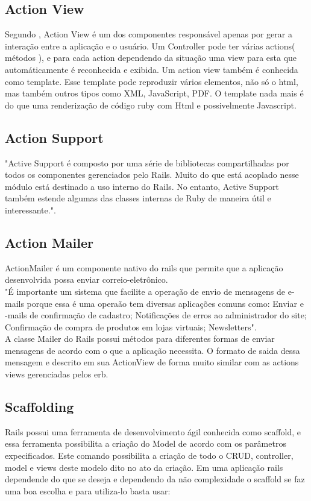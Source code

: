\subsection{Action View}
Segundo \cite{BAKHARIA}, Action View é um dos componentes responsável apenas por gerar a interação entre a aplicação e o usuário. Um Controller pode ter várias actions( métodos ), e para cada action dependendo da situação uma view para esta que automáticamente é reconhecida e exibida.
Um action view também é conhecida como template. Esse template pode reproduzir vários elementos, não só o html, mas também outros tipos como XML, JavaScript, PDF.
O template nada mais é do que uma renderização de código ruby com Html e possivelmente Javascript.


\subsection{Action Support}
"Active Support é composto por uma série de bibliotecas compartilhadas por todos os componentes gerenciados pelo Rails. 
Muito do que está acoplado nesse módulo está destinado a uso interno do Rails.
No entanto, Active Support também estende algumas das classes internas de Ruby de maneira útil e interessante."\cite{PRAGMATICRUBY}.

\subsection{Action Mailer}
ActionMailer é um componente nativo do rails que permite que a aplicação desenvolvida possa enviar correio-eletrônico. 
\\
"É importante um sistema que facilite a operação de envio de mensagens de e-mails porque
essa é uma operaão tem diversas aplicações comuns como: Enviar e -mails de confirmação de
cadastro; Notificações de erros ao administrador do site; Confirmação de compra de produtos
em lojas virtuais; Newsletters".\cite{BAKHARIA}
\\
\noindent A classe Mailer do Rails possui métodos para diferentes formas de enviar mensagens de acordo com o que a aplicação necessita. O formato de saida dessa mensagem
e descrito em sua ActionView de forma muito similar com as actions views gerenciadas pelos erb.

\subsection{Scaffolding}
Rails possui uma ferramenta de desenvolvimento ágil conhecida como scaffold, e essa ferramenta possibilita a criação do Model de acordo com os parâmetros expecificados.
Este comando possibilita a criação de todo o CRUD, controller, model e views deste modelo dito no ato da criação. Em uma aplicação rails dependende do que se deseja e dependendo 
da não complexidade o scaffold se faz uma boa escolha e para utiliza-lo basta usar:


